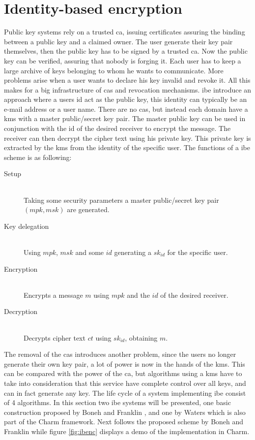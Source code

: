 \section{Identity-based encryption}\label{subsec:IBE}
Public key systems rely on a trusted \gls{ca}, issuing certificates assuring the binding between a public key and a claimed owner. The user generate their key pair themselves, then the public key has to be signed by a trusted \glsdesc{ca}. Now the public key can be verified, assuring that nobody is forging it. Each user has to keep a large archive of keys belonging to whom he wants to communicate. More problems arise when a user wants to declare his key invalid and revoke it. All this makes for a big infrastructure of \glspl{ca} and revocation mechanisms. \Gls{ibe} \cite{DBLP:ibe} introduce an approach where a users id act as the public key, this identity can typically be an e-mail address or a user name. There are no \glspl{ca}, but instead each domain have a \gls{kms} with a master public/secret key pair. The master public key can be used in conjunction with the id of the desired receiver to encrypt the message. The receiver can then decrypt the cipher text using his private key. This private key is extracted by the \gls{kms} from the identity of the specific user. 
The functions of a \gls{ibe} scheme is as following:
\begin{description}
\item[Setup]\hfill \\ Taking some security parameters a master public/secret key pair $(mpk, msk)$ are generated.
\item[Key delegation]\hfill \\Using $mpk$, $msk$ and some $id$ generating a $sk_{id}$ for the specific user. 
\item[Encryption]\hfill \\ Encrypts a message $m$ using $mpk$ and the $id$ of the desired receiver. 
\item[Decryption] \hfill \\Decrypts cipher text $ct$ using $sk_{id}$, obtaining $m$. 
\end{description}
The removal of the \glspl{ca} introduces another problem, since the users no longer generate their own key pair, a lot of power is now in the hands of the \gls{kms}. This can be compared with the power of the \gls{ca}, but algorithms using a \gls{kms} have to take into consideration that this service have complete control over all keys, and can in fact generate any key. The life cycle of a system implementing \gls{ibe} consist of 4 algorithms. In this section two \gls{ibe} systems will be presented, one basic construction proposed by Boneh and Franklin \cite{DBLP:ibe}, and one by Waters \cite{ibe_waters09} which is also part of the Charm framework. Next follows the proposed scheme by Boneh and Franklin while figure \ref{fig:ibenc} displays a demo of the implementation in Charm.



